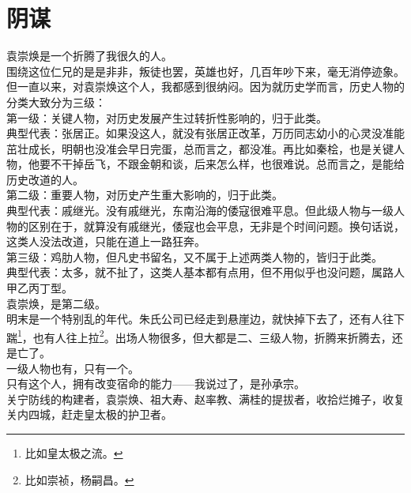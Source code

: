 \section{阴谋}
\ifnum{}
	\begin{multicols}{\theparacolNo}
\fi
袁崇焕是一个折腾了我很久的人。\\

围绕这位仁兄的是是非非，叛徒也罢，英雄也好，几百年吵下来，毫无消停迹象。\\

但一直以来，对袁崇焕这个人，我都感到很纳闷。因为就历史学而言，历史人物的分类大致分为三级：\\

第一级：关键人物，对历史发展产生过转折性影响的，归于此类。\\

典型代表：张居正。如果没这人，就没有张居正改革，万历同志幼小的心灵没准能茁壮成长，明朝也没准会早日完蛋，总而言之，都没准。再比如秦桧，也是关键人物，他要不干掉岳飞，不跟金朝和谈，后来怎么样，也很难说。总而言之，是能给历史改道的人。\\

第二级：重要人物，对历史产生重大影响的，归于此类。\\

典型代表：戚继光。没有戚继光，东南沿海的倭寇很难平息。但此级人物与一级人物的区别在于，就算没有戚继光，倭寇也会平息，无非是个时间问题。换句话说，这类人没法改道，只能在道上一路狂奔。\\

第三级：鸡肋人物，但凡史书留名，又不属于上述两类人物的，皆归于此类。\\

典型代表：太多，就不扯了，这类人基本都有点用，但不用似乎也没问题，属路人甲乙丙丁型。\\

袁崇焕，是第二级。\\

明末是一个特别乱的年代。朱氏公司已经走到悬崖边，就快掉下去了，还有人往下踹\footnote{比如皇太极之流。}，也有人往上拉\footnote{比如崇祯，杨嗣昌。}。出场人物很多，但大都是二、三级人物，折腾来折腾去，还是亡了。\\

一级人物也有，只有一个。\\

只有这个人，拥有改变宿命的能力——我说过了，是孙承宗。\\

关宁防线的构建者，袁崇焕、祖大寿、赵率教、满桂的提拔者，收拾烂摊子，收复关内四城，赶走皇太极的护卫者。\\


\end{multicols}
